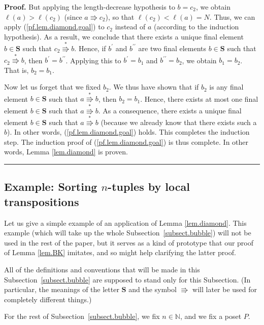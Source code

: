 \documentclass[numbers=enddot,12pt,final,onecolumn,notitlepage]{scrartcl}%
\theoremstyle{definition}
\newenvironment{proof}[1][Proof]{\noindent\textbf{#1.} }{\ \rule{0.5em}{0.5em}}
\newenvironment{verlong}{}{}
\begin{document}
\begin{verlong}
\begin{proof}
But applying the length-decrease hypothesis to $b=c_{2}$, we obtain
$\ell\left(  a\right)  >\ell\left(  c_{2}\right)  $ (since $a\Rrightarrow
c_{2}$), so that $\ell\left(  c_{2}\right)  <\ell\left(  a\right)  =N$. Thus,
we can apply (\ref{pf.lem.diamond.goal}) to $c_{2}$ instead of $a$ (according
to the induction hypothesis). As a result, we conclude that there exists a
unique final element $b\in\mathbf{S}$ such that $c_{2}\overset{\ast
}{\Rrightarrow}b$. Hence, if $b^{\prime}$ and $b^{\prime\prime}$ are two final
elements $b\in\mathbf{S}$ such that $c_{2}\overset{\ast}{\Rrightarrow}b$, then
$b^{\prime}=b^{\prime\prime}$. Applying this to $b^{\prime}=b_{1}$ and
$b^{\prime\prime}=b_{2}$, we obtain $b_{1}=b_{2}$. That is, $b_{2}=b_{1}$.

Now let us forget that we fixed $b_{2}$. We thus have shown that if $b_{2}$ is
any final element $b\in\mathbf{S}$ such that $a\overset{\ast}{\Rrightarrow}b$,
then $b_{2}=b_{1}$. Hence, there exists at most one final element
$b\in\mathbf{S}$ such that $a\overset{\ast}{\Rrightarrow}b$. As a consequence,
there exists a unique final element $b\in\mathbf{S}$ such that $a\overset{\ast
}{\Rrightarrow}b$ (because we already know that there exists such a $b$). In
other words, (\ref{pf.lem.diamond.goal}) holds. This completes the induction
step. The induction proof of (\ref{pf.lem.diamond.goal}) is thus complete. In
other words, Lemma \ref{lem.diamond} is proven.
\end{proof}
\end{verlong}

\subsection{\label{subsect.bubble}Example: Sorting $n$-tuples by local
transpositions}

Let us give a simple example of an application of Lemma \ref{lem.diamond}.
This example (which will take up the whole Subsection~\ref{subsect.bubble})
will not be used in the rest of the paper, but it serves as a kind of
prototype that our proof of Lemma \ref{lem.BK} imitates, and so might help
clarifying the latter proof.

All of the definitions and conventions that will be made in this
Subsection~\ref{subsect.bubble} are supposed to stand only for this
Subsection. (In particular, the meanings of the letter $\mathbf{S}$ and the
symbol $\Rrightarrow$ will later be used for completely different things.)

For the rest of Subsection~\ref{subsect.bubble}, we fix $n\in\mathbb{N}$, and
we fix a poset $P$.
\end{document}
